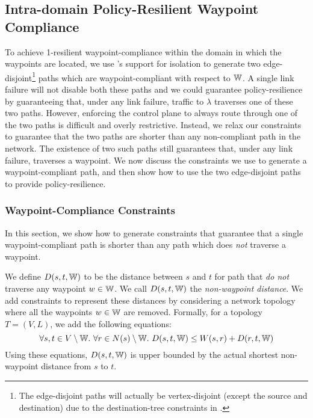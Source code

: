 \subsection{Intra-domain Policy-Resilient Waypoint Compliance}\label{sec:ospfwaypoint}
To achieve 1-resilient waypoint-compliance within the domain
in which the waypoints are located, we use \genesis's
support for isolation to generate two edge-disjoint\footnote
{The edge-disjoint paths will actually be vertex-disjoint (except the 
	source and destination) due to the destination-tree constraints
	in \genesis.} paths
which are waypoint-compliant with respect to $\mathbb{W}$. A single link
failure will not disable both these paths
and we could guarantee policy-resilience by 
guaranteeing that, under any link failure,
traffic to $\lambda$ 
traverses one of these two paths. However, enforcing the control plane to 
always route through one of the two paths is difficult and overly 
restrictive. 
Instead, we relax our constraints to guarantee that
the two paths are shorter than any non-compliant path in 
the network. The existence of two such paths still guarantees that,
under any link failure,
 traverses a waypoint. 
We now discuss the
constraints we use to generate 
a waypoint-compliant path, and then show
how to use the two edge-disjoint 
paths to provide policy-resilience. 


\subsubsection{Waypoint-Compliance Constraints}
\label{sec:waypoint-compliance-constraints}
In this section, we show how to generate constraints that
guarantee that a single waypoint-compliant path is shorter
than any path which does \emph{not} traverse a waypoint. 

We define $D(s,t,\mathbb{W})$ to be the 
distance between $s$ and $t$ for path that \emph{do not}
 traverse any waypoint $w \in \mathbb{W}$.
We call  $D(s,t,\mathbb{W})$ the \emph{non-waypoint distance}.
  We
   add constraints to represent these distances by
  considering a network topology where all the  
  waypoints $w \in \mathbb{W}$ are removed. Formally, for a topology 
 $T = (V,L)$, we add the following equations:
\begin{equation} \label{eq:wdistance}
\forall s, t \in V \setminus \mathbb{W}. ~\forall r \in N(s) \setminus \mathbb{W}.~
D(s, t, \mathbb{W}) \leq W(s, r) + D(r,t,\mathbb{W})
\end{equation}
Using these equations,
$D(s,t,\mathbb{W})$ is upper bounded by the actual shortest non-waypoint distance from $s$ to $t$.

